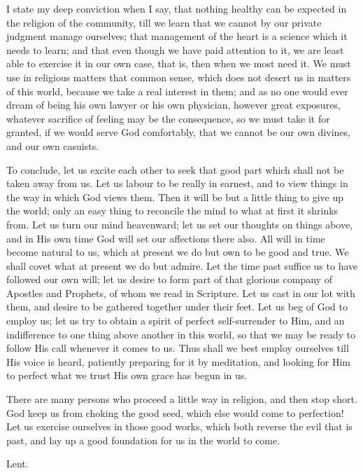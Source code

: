 I state my deep conviction when I say, that nothing healthy can be
expected in the religion of the community, till we learn that we
cannot by our private judgment manage ourselves; that management of
the heart is a science which it needs to learn; and that even though
we have paid attention to it, we are least able to exercise it in our
own case, that is, then when we most need it. We must use in religious
matters that common sense, which does not desert us in matters of this
world, because we take a real interest in them; and as no one would
ever dream of being his own lawyer or his own physician, however great
exposures, whatever sacrifice of feeling may be the consequence, so we
must take it for granted, if we would serve God comfortably, that we
cannot be our own divines, and our own casuists.

To conclude, let us excite each other to seek that good part which
shall not be taken away from us. Let us labour to be really in
earnest, and to view things in the way in which God views them. Then
it will be but a little thing to give up the world; only an easy thing
to reconcile the mind to what at first it shrinks from. Let us turn
our mind heavenward; let us set our thoughts on things above, and in
His own time God will set our affections there also. All will in time
become natural to us, which at present we do but own to be good and
true. We shall covet what at present we do but admire. Let the time
past suffice us to have followed our own will; let us desire to form
part of that glorious company of Apostles and Prophets, of whom we
read in Scripture. Let us cast in our lot with them, and desire to be
gathered together under their feet. Let us beg of God to employ us;
let us try to obtain a spirit of perfect self-surrender to Him, and an
indifference to one thing above another in this world, so that we may
be ready to follow His call whenever it comes to us. Thus shall we
best employ ourselves till His voice is heard, patiently preparing for
it by meditation, and looking for Him to perfect what we trust His own
grace has begun in us.

There are many persons who proceed a little way in religion, and
then stop short. God keep us from choking the good seed, which else
would come to perfection! Let us exercise ourselves in those good
works, which both reverse the evil that is past, and lay up a good
foundation for us in the world to come.


Lent.

